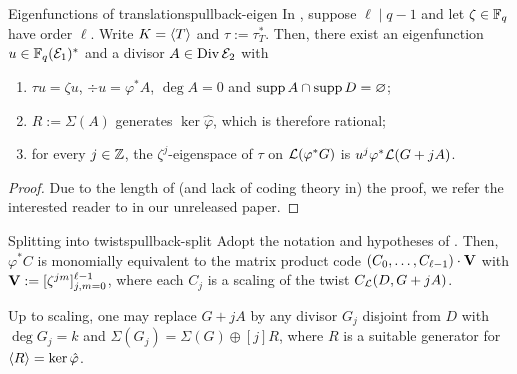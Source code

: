 \documentclass[twocolumn, 11pt]{scrartcl}
\begin{document}
\begin{lemma}{Eigenfunctions of translations}{pullback-eigen}
    In , suppose $\ell\mid q-1$ and let $\zeta\in\mathbb{F}_q$ have order $\ell$. Write $K=\langle T\rangle$ and $\tau:=\tau_T^*$. Then, there exist an eigenfunction $u\in\mathbb{F}_q(\mathcal{E}_1)^*$ and a divisor $A\in\operatorname{Div}\mathcal{E}_2$ with
    \begin{enumerate}
        \item \label{enum:eigen-u} $\tau u=\zeta u$, $\div u=\varphi^*A$, $\deg A=0$ and $\operatorname{supp} A\cap\operatorname{supp} D=\varnothing$;
        \item \label{enum:eigen-R} $R:=\Sigma(A)$ generates $\ker\hat\varphi$, which is therefore rational;
        \item \label{enum:eigen-space} for every $j\in\mathbb{Z}$, the $\zeta^j$-eigenspace of $\tau$ on $\mathcal{L}(\varphi^*G)$ is $u^j\varphi^*\mathcal{L}(G+jA)$.
    \end{enumerate}
\end{lemma}

\begin{proof}
    Due to the length of (and lack of coding theory in) the proof, we refer the interested reader to \cite[Lem.~15]{upcoming-paper} in our unreleased paper.
\end{proof}

\begin{theorem}{Splitting into twists}{pullback-split}
    Adopt the notation and hypotheses of . Then, $\varphi^*C$ is monomially equivalent to the matrix product code $(C_0,\hdots,C_{\ell-1})\cdot \mathbf{V}$ with $\mathbf{V}:=[\zeta^{jm}]_{j,m=0}^{\ell-1}$, where each $C_j$ is a scaling of the twist $C_\mathcal{L}(D,G+jA)$.

    Up to scaling, one may replace $G+jA$ by any divisor $G_j$ disjoint from $D$ with $\deg G_j=k$ and $\Sigma(G_j)=\Sigma(G)\oplus[j]R$, where $R$ is a suitable generator for $\langle R\rangle=\ker\hat\varphi$.
\end{theorem}
\end{document}

